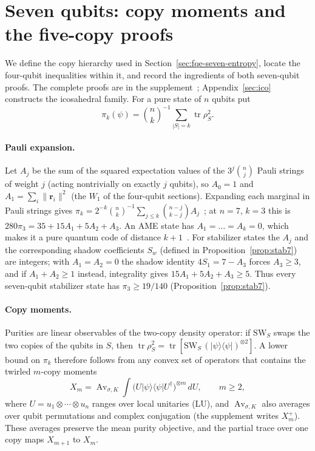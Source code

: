 \section{Seven qubits: copy moments and the five-copy proofs}\label{sec:fqe-seven}

We define the copy hierarchy used in Section~\ref{sec:fqe-seven-entropy}, locate the four-qubit inequalities
within it, and record the ingredients of both seven-qubit
proofs. The complete proofs are in the supplement~\cite{Companion};
Appendix~\ref{sec:ico} constructs the icosahedral family. For a pure state of $n$ qubits put
\[
 \pi_k(\psi)=\binom nk^{-1}\sum_{|S|=k}\operatorname{tr}\rho_S^2.
\]

\paragraph{Pauli expansion.} Let $A_j$ be the sum of the squared expectation values of the $3^j\binom nj$ Pauli strings
of weight $j$ (acting nontrivially on exactly $j$ qubits), so $A_0=1$ and $A_1=\sum_i\|\mathbf r_i\|^2$ (the $W_1$ of
the four-qubit sections). Expanding each marginal in Pauli strings gives
$\pi_k=2^{-k}\binom nk^{-1}\sum_{j\le k}\binom{n-j}{k-j}A_j$~\cite{Rains}; at $n=7$, $k=3$ this is
$280\pi_3=35+15A_1+5A_2+A_3$. An AME state has $A_1=\dots=A_k=0$, which makes it a pure quantum code of distance
$k+1$~\cite{Scott}. For stabilizer states the $A_j$ and the corresponding shadow coefficients $S_w$ (defined in Proposition~\ref{prop:stab7}) are integers; with
$A_1=A_2=0$ the shadow identity $4S_1=7-A_3$ forces $A_3\ge3$, and if $A_1+A_2\ge1$ instead, integrality gives
$15A_1+5A_2+A_3\ge5$. Thus every seven-qubit stabilizer state has $\pi_3\ge19/140$ (Proposition~\ref{prop:stab7}).

\paragraph{Copy moments.} Purities are linear observables of the two-copy density operator: if $\mathrm{SW}_S$ swaps the two
copies of the qubits in $S$, then $\operatorname{tr}\rho_S^2=\operatorname{tr}[\mathrm{SW}_S\,(|\psi\rangle
\langle\psi|)^{\otimes2}]$. A lower bound on $\pi_k$ therefore follows from any convex set of operators
that contains the twirled $m$-copy moments
\[
  X_m=\operatorname{Av}_{\sigma,K}\int\bigl(U|\psi\rangle\langle\psi|U^\dagger\bigr)^{\otimes m}\,dU,
  \qquad m\ge2,
\]
where $U=u_1\otimes\cdots\otimes u_n$ ranges over local unitaries (LU), and
$\operatorname{Av}_{\sigma,K}$ also averages over qubit permutations and complex conjugation (the supplement writes $X_m^+$).
These averages preserve the mean purity objective, and the partial trace over one copy maps $X_{m+1}$ to $X_m$.

